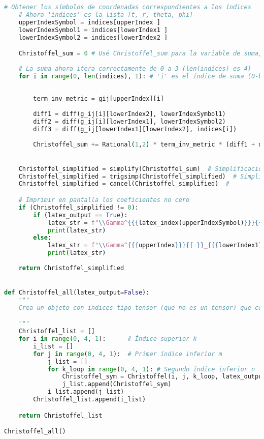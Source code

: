 \begin{lstlisting}[language=Python, caption=Programa para el calculo de símbolos de  Christoffel]
    # Obtener los símbolos de coordenadas correspondientes a los índices
    # Ahora 'indices' es la lista [t, r, theta, phi]
    upperIndexSymbol = indices[upperIndex ]
    lowerIndexSymbol1 = indices[lowerIndex1 ]
    lowerIndexSymbol2 = indices[lowerIndex2 ]

    Christoffel_sum = 0 # Usé Christoffel_sum para la variable de suma, pero tu 'Christoffel = 0' original también funciona debido al alcance.
    
    # La suma ahora itera correctamente de 0 a 3 (len(indices) es 4)
    for i in range(0, len(indices), 1): # 'i' es el índice de suma (0-basado)
        
       
        term_inv_metric = gij[upperIndex][i]
        
        diff1 = diff(g_ij[i][lowerIndex2], lowerIndexSymbol1)
        diff2 = diff(g_ij[i][lowerIndex1], lowerIndexSymbol2)
        diff3 = diff(g_ij[lowerIndex1][lowerIndex2], indices[i])
        
        Christoffel_sum += Rational(1,2) * term_inv_metric * (diff1 + diff2 - diff3)


    Christoffel_simplified = simplify(Christoffel_sum)  # Simplificación general
    Christoffel_simplified = trigsimp(Christoffel_simplified)  # Simplifica funciones trigonométricas
    Christoffel_simplified = cancel(Christoffel_simplified)  #

    # Imprimir en pantalla los coeficientes no cero
    if (Christoffel_simplified != 0):
        if (latex_output == True):
            latex_str = f"\\Gamma^{{{latex_index(upperIndexSymbol)}}}{{ }}_{{{latex_index(lowerIndexSymbol1)} {latex_index(lowerIndexSymbol2)}}} &= {latex(Christoffel_simplified)} \\\\"
            print(latex_str)
        else:
            latex_str = f"\\Gamma^{{{upperIndex}}}{{ }}_{{{lowerIndex1} {lowerIndex2}}} &= {latex(Christoffel_simplified)} \\\\"
            print(latex_str)
    
    return Christoffel_simplified


def Christoffel_all(latex_output=False):
    """
    Crea un objeto con indices tipo tensor (que no es un tensor) que contiene todos los Christoffel

    """
    Christoffel_list = []
    for i in range(0, 4, 1):      # Índice superior k
        i_list = []
        for j in range(0, 4, 1):  # Primer índice inferior m
            j_list = []
            for k_loop in range(0, 4, 1): # Segundo índice inferior n 
                Christoffel_sym = Christoffel(i, j, k_loop, latex_output=latex_output)
                j_list.append(Christoffel_sym)
            i_list.append(j_list)
        Christoffel_list.append(i_list)

    return Christoffel_list

Christoffel_all()
\end{lstlisting}

